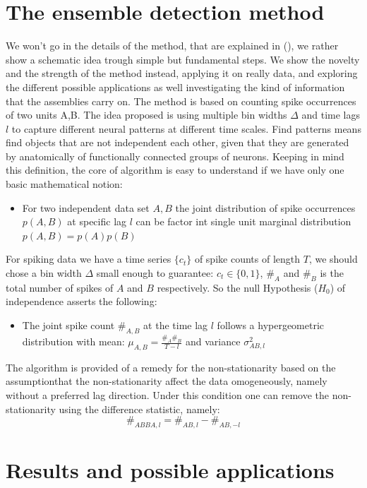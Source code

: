 \documentclass{article}
\begin{document}
\section{The ensemble detection method}
We won't go in the details of the method, that are explained in (\cite{RussoDurstewitz}), we rather show a schematic idea trough simple but fundamental steps. We show the novelty and the strength of the method instead, applying it on really data, and exploring the different possible applications as well investigating the kind of information that the assemblies carry on.
The method is based on counting spike occurrences of two units A,B. The idea proposed is using  multiple bin widths $\Delta$ and time lags $l$ to capture different neural patterns at different time scales. Find patterns means find objects that are not independent each other, given that they are generated by anatomically of functionally connected groups of neurons. Keeping in mind this definition, the core of algorithm is easy to understand if we have only one basic mathematical notion:
\begin{itemize}
    \item For two independent data set $A, B$ the joint distribution of spike occurrences $p(A,B)$ at specific lag $l$ can be factor int single unit marginal distribution $p(A,B)=p(A)p(B)$
\end{itemize}
For spiking data we have a time series $\{c_t\}$ of spike counts of length $T$, we should chose a bin width $\Delta$ small enough to guarantee: $c_t \in \{0,1\}$, $\#_A$ and $\#_B$ is the total number of spikes of $A$ and $B$ respectively. So the null Hypothesis ($H_0$) of independence asserts the following:
\begin{itemize}
    \item The joint spike count $\#_{A,B}$ at the time lag $l$ follows a hypergeometric distribution with mean: $\mu_{A,B} = \frac{\#_A \#_B}{T-l}$ and variance $\sigma^2_{AB,l}$
\end{itemize}
The algorithm is provided of a remedy for the non-stationarity based on the assumptionthat the non-stationarity affect the data omogeneously, namely without a preferred lag direction. Under this condition one can remove the non-stationarity using the difference statistic, namely:
$$\#_{ABBA,l}=\#_{AB,l}-\#_{AB,-l}$$

\section{Results and possible applications}
\end{document}
